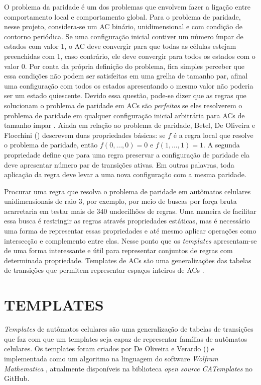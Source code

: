 \documentclass[12pt,a4paper]{article}
\let\stdsection\section
\renewcommand\section{\newpage\stdsection}
\begin{document}
O problema da paridade é um dos problemas que envolvem fazer a ligação entre comportamento local e comportamento global. Para o problema de paridade, nesse projeto, considera-se um AC binário, unidimensional e com condição de contorno periódica. Se uma configuração inicial contiver um número ímpar de estados com valor 1, o AC deve convergir para que todas as células estejam preenchidas com 1, caso contrário, ele deve convergir para todos os estados com o valor 0. Por conta da própria definição do problema, fica simples perceber que essa condições não podem ser satisfeitas em uma grelha de tamanho par, afinal uma configuração com todos os estados apresentando o mesmo valor não poderia ser um estado quiescente. Devido essa questão, pode-se dizer que as regras que solucionam o problema de paridade em ACs são \textit{perfeitas} se eles resolverem o problema de paridade em qualquer configuração inicial arbitrária para ACs de tamanho ímpar \cite{Betel2013}. Ainda em relação ao problema de paridade, Betel, De Oliveira e Flocchini (\citeyear{Betel2013}) descrevem duas propriedades básicas: se $f$ é a regra local que resolve o problema de paridade, então $f(0, \dots, 0) = 0$ e $f(1, \dots, 1) = 1$. A segunda propriedade define que para uma regra preservar a configuração de paridade ela deve apresentar número par de transições ativas. Em outras palavras, toda aplicação da regra deve levar a uma nova configuração com a mesma paridade.

Procurar uma regra que resolva o problema de paridade em autômatos celulares unidimensionais de raio 3, por exemplo, por meio de buscas por força bruta acarretaria em testar mais de 340 undecilhões de regras. Uma maneira de facilitar essa busca é restringir as regras através propriedades estáticas, mas é necessário uma forma de representar essas propriedades e até mesmo aplicar operações como intersecção e complemento entre elas. Nesse ponto que os \textit{templates} apresentam-se de uma forma interessante e útil para representar conjuntos de regras com determinada propriedade. Templates de ACs são uma generalizações das tabelas de transições que permitem representar espaços inteiros de ACs \cite{Verardo2014}.








\section{TEMPLATES}\label{sec:templates}
\textit{Templates} de autômatos celulares são uma generalização de tabelas de transições que faz com que um templates seja capaz de representar famílias de autômatos celulares. Os templates foram criados por De Oliveira e Verardo (\citeyear{deOliveira2014}) e implementada como um algoritmo na linguagem do software \textit{Wolfram Mathematica} \cite{woframMathematica10}, atualmente disponíveis na biblioteca \textit{open source CATemplates} \cite{CATemplates} no GitHub.
\end{document}
